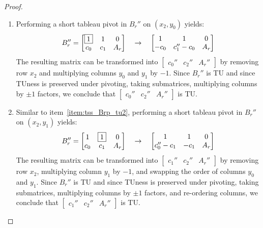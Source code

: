 \begin{proof}
\begin{enumerate}
        \item Performing a short tableau pivot in $B_{r}''$ on $(x_{2}, y_{0})$ yields:
        \[
            B_{r}'' = \begin{bmatrix}
                \fbox{1} & 1 & 0 \\
                c_{0} & c_{1} & A_{r}
            \end{bmatrix}
            \quad \to \quad
            \begin{bmatrix}
                1 & 1 & 0 \\
                -c_{0} & c_{1}'' - c_{0} & A_{r}
            \end{bmatrix}
        \]
        The resulting matrix can be transformed into $\begin{bmatrix} c_{0}'' & c_{2}'' & A_{r}'' \end{bmatrix}$ by removing row $x_{2}$ and multiplying columns $y_{0}$ and $y_{1}$ by $-1$. Since $B_{r}''$ is TU and since TUness is preserved under pivoting, taking submatrices, multiplying columns by ${\pm 1}$ factors, we conclude that $\begin{bmatrix} c_{0}'' & c_{2}'' & A_{r}'' \end{bmatrix}$ is TU.

        \item Similar to item~\ref{item:tss_Brp_tu2}, performing a short tableau pivot in $B_{r}''$ on $(x_{2}, y_{1})$ yields:
        \[
            B_{r}'' = \begin{bmatrix}
                1 & \fbox{1} & 0 \\
                c_{0} & c_{1} & A_{r}
            \end{bmatrix}
            \quad \to \quad
            \begin{bmatrix}
                1 & 1 & 0 \\
                c_{0}'' - c_{1} & -c_{1} & A_{r}
            \end{bmatrix}
        \]
        The resulting matrix can be transformed into $\begin{bmatrix} c_{1}'' & c_{2}'' & A_{r}'' \end{bmatrix}$ by removing row $x_{2}$, multiplying column $y_{1}$ by $-1$, and swapping the order of columns $y_{0}$ and $y_{1}$. Since $B_{r}''$ is TU and since TUness is preserved under pivoting, taking submatrices, multiplying columns by ${\pm 1}$ factors, and re-ordering columns, we conclude that $\begin{bmatrix} c_{1}'' & c_{2}'' & A_{r}'' \end{bmatrix}$ is TU.


\end{enumerate}
\end{proof}
